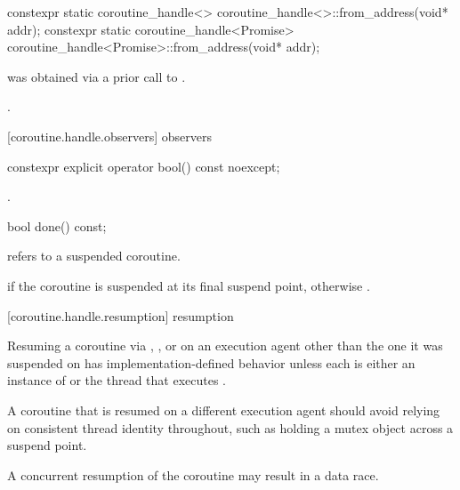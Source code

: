 \begin{itemdecl}
constexpr static coroutine_handle<> coroutine_handle<>::from_address(void* addr);		
constexpr static coroutine_handle<Promise> coroutine_handle<Promise>::from_address(void* addr);		
\end{itemdecl}

\begin{itemdescr}
\pnum
\requires {} was obtained via a prior call to .
	
\pnum
\ensures {}.
\end{itemdescr}

[coroutine.handle.observers]{ observers}

\begin{itemdecl}
constexpr explicit operator bool() const noexcept;
\end{itemdecl}

\begin{itemdescr}
\pnum
\returns {}.
\end{itemdescr}

\begin{itemdecl}
bool done() const; 
\end{itemdecl}

\begin{itemdescr}
\pnum
\requires {} refers to a suspended coroutine.
	
\pnum
\returns {} if the coroutine is suspended at its
final suspend point, otherwise .
\end{itemdescr}

[coroutine.handle.resumption]{ resumption}

\pnum
Resuming a coroutine via , ,
or  on an execution agent other than the one it was
suspended on has implementation-defined behavior unless each is either
an instance of  or the thread that executes .

\begin{note}
A coroutine that is resumed on a different execution agent should
avoid relying on consistent thread identity throughout, such as holding
a mutex object across a suspend point.
\end{note}

\begin{note}
A concurrent resumption of the coroutine may result in a data race.
\end{note}

